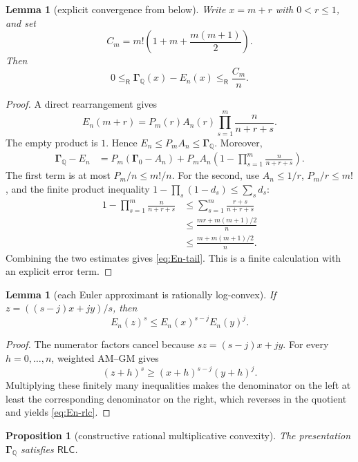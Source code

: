 \documentclass[11pt]{article}
\newtheorem{lemma}[theorem]{Lemma}
\newtheorem{proposition}[theorem]{Proposition}
\newcommand{\Q}{\mathbb Q}
\newcommand{\Gam}{\boldsymbol\Gamma}
\newcommand{\Le}{\mathrel{\le_{\!\mathsf R}}}
\newcommand{\RLC}{\mathsf{RLC}}
\begin{document}
\begin{lemma}[explicit convergence from below]
Write $x=m+r$ with $0<r\le1$, and set
\[
 C_m=m!\left(1+m+\frac{m(m+1)}2\right).
\]
Then
\begin{equation}
 0\Le \Gam_{\Q}(x)-E_n(x)\Le\frac{C_m}{n}.
 \label{eq:En-tail}
\end{equation}
\end{lemma}

\begin{proof}
A direct rearrangement gives
\begin{equation}
 E_n(m+r)=P_m(r)A_n(r)
 \prod_{s=1}^{m}\frac{n}{n+r+s}.
 \label{eq:En-factor}
\end{equation}
The empty product is $1$.  Hence $E_n\le P_mA_n\le\Gam_{\Q}$.
Moreover,
\begin{align*}
 \Gam_{\Q}-E_n
 &=P_m(\Gam_0-A_n)
   +P_mA_n\left(1-\prod_{s=1}^{m}\frac{n}{n+r+s}\right).
\end{align*}
The first term is at most $P_m/n\le m!/n$.  For the second, use
$A_n\le1/r$, $P_m/r\le m!$, and the finite product inequality
$1-\prod_s(1-d_s)\le\sum_s d_s$:
\begin{align*}
 1-\prod_{s=1}^{m}\frac{n}{n+r+s}
 &\le\sum_{s=1}^{m}\frac{r+s}{n+r+s}\\
 &\le\frac{mr+m(m+1)/2}{n}\\
 &\le\frac{m+m(m+1)/2}{n}.
\end{align*}
Combining the two estimates gives \eqref{eq:En-tail}.  This is a finite
calculation with an explicit error term.
\end{proof}

\begin{lemma}[each Euler approximant is rationally log-convex]
If $z=((s-j)x+jy)/s$, then
\begin{equation}
 E_n(z)^s\le E_n(x)^{s-j}E_n(y)^j.
 \label{eq:En-rlc}
\end{equation}
\end{lemma}

\begin{proof}
The numerator factors cancel because $sz=(s-j)x+jy$.  For every
$h=0,\dots,n$, weighted AM--GM gives
\[
 (z+h)^s\ge(x+h)^{s-j}(y+h)^j.
\]
Multiplying these finitely many inequalities makes the denominator on the
left at least the corresponding denominator on the right, which reverses in
the quotient and yields \eqref{eq:En-rlc}.
\end{proof}

\begin{proposition}[constructive rational multiplicative convexity]
The presentation $\Gam_{\Q}$ satisfies $\RLC$.
\end{proposition}
\end{document}
